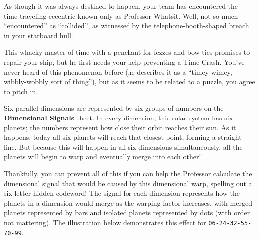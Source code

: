 As though it was always destined to happen, your team has encountered
the time-traveling eccentric known only as Professor Whatsit. Well, not
so much ``encountered'' as ``collided'', as witnessed by the 
telephone-booth-shaped breach in your starboard hull.

This whacky master of time with a penchant for fezzes and bow ties promises to
repair your ship, but he first needs your help preventing a
Time Crash. You've never heard of this phenomenon before (he describes it as a
``timey-wimey, wibbly-wobbly sort of thing''), but as it seems to be 
related to a puzzle, you agree to pitch in.

Six parallel dimensions are represented by six groups of numbers on
the \textbf{Dimensional Signals} sheet. In every dimension, this solar system
has six planets; the numbers represent how close their orbit reaches their sun.
As it happens, today all six planets will reach that closest
point, forming a straight line. But because this will happen
in all six dimensions simultaneously, all the planets will begin
to warp and eventually merge into each other!
%

Thankfully, you can prevent all of this if you can help the Professor
calculate the dimensional signal that would be caused by this dimensional
warp, spelling out a six-letter hidden codeword!
The signal for each dimension represents how
the planets in a dimension would merge as the warping factor increases,
with merged planets represented by bars and isolated planets represented
by dots (with order not mattering). 
The illustration below demonstrates this effect for \texttt{06-24-32-55-70-99}.

